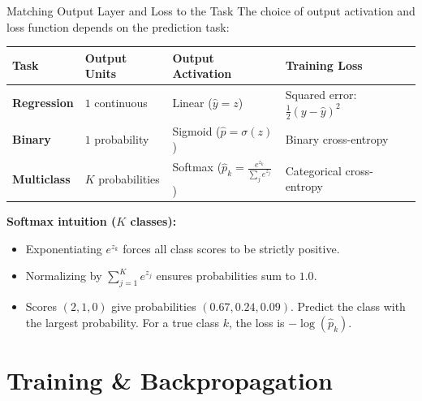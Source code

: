\begin{frame}{Matching Output Layer and Loss to the Task}
    \small
    The choice of output activation and loss function depends on the prediction task:
    \begin{center}
    \footnotesize
    \begin{tabular}{@{}llll@{}}
    \toprule
    Task & Output Units & Output Activation & Training Loss \\
    \midrule
    \textbf{Regression} & $1$ continuous & Linear ($\hat{y} = z$) & Squared error: $\frac{1}{2}(y - \hat{y})^2$ \\
    \textbf{Binary} & $1$ probability & Sigmoid ($\hat{p} = \sigma(z)$) & Binary cross-entropy \\
    \textbf{Multiclass} & $K$ probabilities & Softmax ($\hat{p}_k = \frac{e^{z_k}}{\sum_j e^{z_j}}$) & Categorical cross-entropy \\
    \bottomrule
    \end{tabular}
    \end{center}
    \vspace{-0.2em}
    \textbf{Softmax intuition ($K$ classes):}
    \begin{itemize}
        \item Exponentiating $e^{z_k}$ forces all class scores to be strictly positive.
        \item Normalizing by $\sum_{j=1}^K e^{z_j}$ ensures probabilities sum to $1.0$.
        \item Scores $(2,1,0)$ give probabilities $(0.67,0.24,0.09)$. Predict the class with the largest probability. For a true class $k$, the loss is $-\log(\hat p_k)$.
    \end{itemize}
\end{frame}


\section{Training \& Backpropagation}

